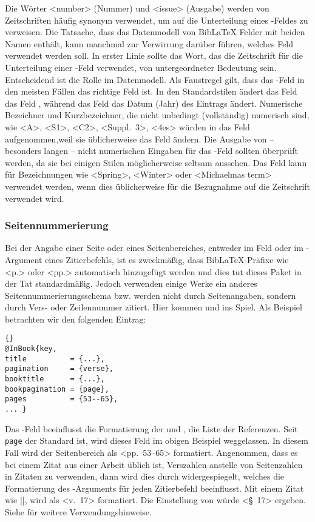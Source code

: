 \documentclass{ltxdockit}[2011/03/25]
\newcommand*{\biblatex}{BibLaTeX\xspace}
\begin{document}
Die Wörter <number> (Nummer) und <issue> (Ausgabe) werden von Zeitschriften häufig synonym verwendet, um auf die Unterteilung eines -Feldes zu verweisen. Die Tatsache, dass das Datenmodell von \biblatex Felder mit beiden
Namen enthält, kann manchmal zur Verwirrung darüber führen, welches Feld verwendet werden soll. In erster Linie sollte das Wort, das die Zeitschrift für die Unterteilung einer -Feld verwendet, von untergeordneter Bedeutung sein. Entscheidend ist die Rolle im Datenmodell. Als Faustregel gilt, dass das -Feld in den meisten Fällen das richtige Feld ist. In den
Standardstilen ändert das Feld  das Feld ,
während das Feld  das Datum (Jahr) des Eintrags ändert. Numerische Bezeichner und Kurzbezeichner, die nicht unbedingt (vollständig) numerisch sind, wie
<A>, <S1>, <C2>, <Suppl.\ 3>, <4es> würden in das Feld  aufgenommen,weil sie üblicherweise das Feld  ändern. Die Ausgabe von -- besonders langen -- nicht numerischen Eingaben für das -Feld sollten überprüft werden, da sie bei einigen Stilen möglicherweise seltsam aussehen. Das Feld  kann für Bezeichnungen wie <Spring>, <Winter> oder <Michaelmas term> verwendet werden, wenn dies üblicherweise für die Bezugnahme auf die Zeitschrift verwendet wird.


\subsubsection{Seitennummerierung} \label{bib:use:pag}

Bei der Angabe einer Seite oder eines Seitenbereiches, entweder im Feld
 oder im -Argument eines Zitierbefehls, ist es
zweckmäßig, dass \biblatex-Präfixe wie <p.> oder <pp.> automatisch
hinzugefügt werden und dies tut dieses Paket in der Tat standardmäßig. Jedoch
verwenden einige Werke ein anderes Seitennummerierungsschema bzw. werden nicht
durch Seitenangaben, sondern durch Vers- oder Zeilennummer zitiert. Hier kommen
 und  ins Spiel. Als Beispiel
betrachten wir den folgenden Eintrag:

\begin{lstlisting}[style=bibtex]{} 
@InBook{key, 
title          = {...},
pagination     = {verse},
booktitle      = {...}, 
bookpagination = {page}, 
pages	       = {53--65}, 
... }
\end{lstlisting}
%
Das -Feld beeinflusst die Formatierung der  und
, die Liste der Referenzen. Seit \texttt{page} der Standard
ist, wird dieses Feld im obigen Beispiel weggelassen. In diesem Fall wird der
Seitenbereich als <pp.~53--65> formatiert. Angenommen, dass es bei einem Zitat
aus einer Arbeit üblich ist, Verszahlen anstelle von Seitenzahlen in Zitaten zu
verwenden, dann wird dies durch  widergespiegelt, welches
die Formatierung des -Arguments für jeden Zitierbefehl
beeinflusst. Mit einem Zitat wie |\cite[17]{key}|, wird  als
<v.~17> formatiert. Die Einstellung von  würde <\S~17>
ergeben. Siehe  für weitere Verwendungshinweise.
\end{document}
